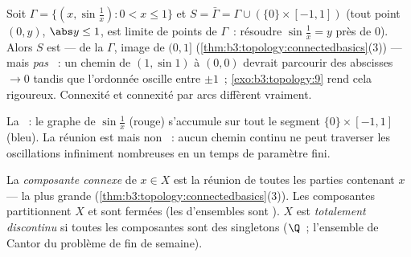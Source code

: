 \begin{example}
\label{ex:b3:topology:sinecurve}
Soit $\Gamma = \{(x, \sin\frac1x) : 0 < x \leq 1\}$ et $S =
\bar\Gamma = \Gamma \cup (\{0\}\times[-1,1])$ (tout point $(0,
y)$, $\abs y \leq 1$, est limite de points de $\Gamma$~:
résoudre $\sin\frac1x = y$ près de $0$). Alors $S$ est
\emph{} ---  de la  $\Gamma$, image
 de $(0, 1]$
(\cref{thm:b3:topology:connectedbasics}(3)) --- mais
\emph{pas }~: un chemin de $(1, \sin 1)$ à
$(0,0)$ devrait parcourir des abscisses $\to 0$ tandis que
l'ordonnée oscille entre $\pm1$~;
\cref{exo:b3:topology:9} rend cela rigoureux. Connexité et
connexité par arcs diffèrent vraiment.
\end{example}

\begin{omfigure}

{\small La ~: le graphe de
$\sin\frac1x$ (rouge) s'accumule sur tout le segment
$\{0\}\times[-1,1]$ (bleu). La réunion est  mais non
~: aucun chemin continu ne peut traverser les
oscillations infiniment nombreuses en un temps de paramètre
fini.}
\end{omfigure}

\begin{definition}\label{def:b3:topology:components}
La \emph{composante connexe} de $x
\in X$ est la réunion de toutes les parties  contenant
$x$ --- la plus grande
(\cref{thm:b3:topology:connectedbasics}(3)). Les composantes
partitionnent $X$ et sont fermées (les  d'ensembles
 sont ). $X$ est \emph{totalement discontinu}
si toutes les composantes sont des singletons ($\Q$~; l'ensemble
de Cantor du problème de fin de semaine).
\end{definition}

